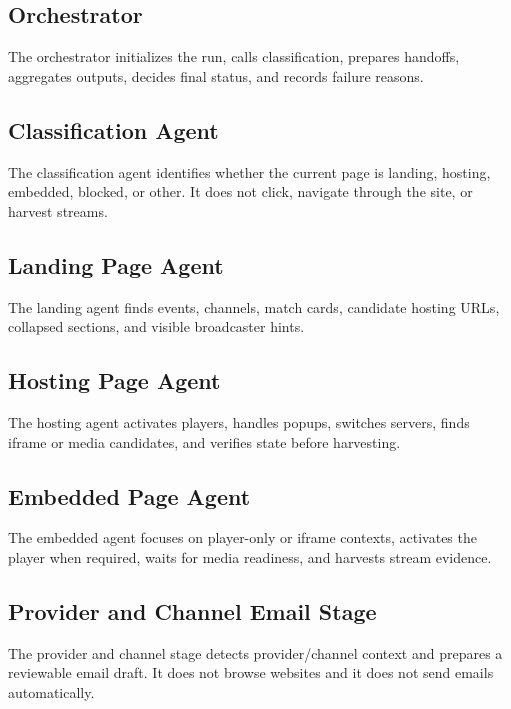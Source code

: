 

\subsection{Orchestrator}

The orchestrator initializes the run, calls classification, prepares handoffs,
aggregates outputs, decides final status, and records failure reasons.

\subsection{Classification Agent}

The classification agent identifies whether the current page is landing,
hosting, embedded, blocked, or other. It does not click, navigate through the
site, or harvest streams.

\subsection{Landing Page Agent}

The landing agent finds events, channels, match cards, candidate hosting URLs,
collapsed sections, and visible broadcaster hints.

\subsection{Hosting Page Agent}

The hosting agent activates players, handles popups, switches servers, finds
iframe or media candidates, and verifies state before harvesting.

\subsection{Embedded Page Agent}

The embedded agent focuses on player-only or iframe contexts, activates the
player when required, waits for media readiness, and harvests stream evidence.

\subsection{Provider and Channel Email Stage}

The provider and channel stage detects provider/channel context and prepares a
reviewable email draft. It does not browse websites and it does not send
emails automatically.

